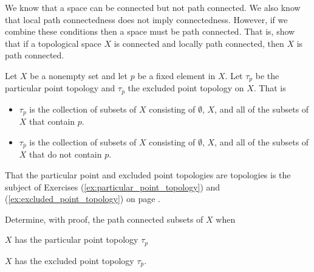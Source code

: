 \item We know that a space can be connected but not path connected. We also know that local path connectedness does not imply connectedness. However, if we combine these conditions then a space must be path connected. That is, show that if a topological space $X$ is connected and locally path connected, then $X$ is path connected. 

\begin{comment}

\ExerciseSolution Let $X$ be a topological space that is connected and locally path connected. We know that $X$ can be written as a disjoint union of path components. That is $X = \bigcup_{\alpha \in I} P_{\alpha}$, where $P_{\alpha}$ are the distinct path components in $X$ for $\alpha$ in some indexing set $I$. Since $X$ is locally path connected, we know that each $P_{\alpha}$ is and open set. So if there is more than one path component, say $P_{\alpha}$ and $P_{\beta}$, then $P_{\alpha}$ and $\bigcup_{\substack{\gamma \in I \\ \gamma \neq \alpha}} P_{\gamma}$ form a separation of $X$. But this is impossible if $X$ is connected, so we conclude that there is only one path component in $X$ and $X$ is path connected. 

\end{comment}


\item Let $X$ be a nonempty set and let $p$ be a fixed element in $X$. Let $\tau_p$ be the particular point topology and $\tau_{\overline{p}}$ the excluded point topology on $X$. That is
\begin{itemize}
\item $\tau_{p}$ is the collection of subsets of $X$ consisting of $\emptyset$, $X$, and all of the subsets of $X$ that contain $p$.  
\item $\tau_{\overline{p}}$ is the collection of subsets of $X$ consisting of $\emptyset$, $X$, and all of the subsets of $X$ that do not contain $p$. 
\end{itemize}
That the particular point and excluded point topologies are topologies is the subject of Exercises (\ref{ex:particular_point_topology}) and (\ref{ex:excluded_point_topology}) on page \pageref{ex:particular_point_topology}. 

Determine, with proof, the path connected subsets of $X$ when 
\ba
\item $X$ has the particular point topology $\tau_p$

\item $X$ has the excluded point topology $\tau_{\overline{p}}$. 

